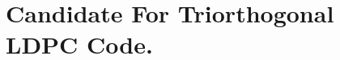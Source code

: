 \documentclass[manuscript,screen,review]{acmart}
\begin{document}
%
%
%
%
%
%
%
%
\section{Candidate For Triorthogonal LDPC Code.}
\end{document}
